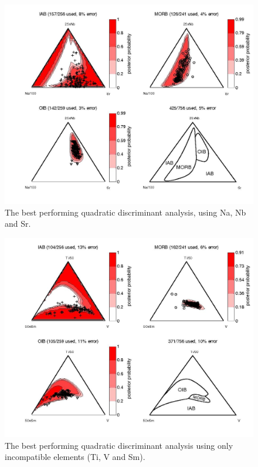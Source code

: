 \clearpage

\begin{figure}[htbp]
  \centering
  \includegraphics[width=600]{figures/Na_Nb_Sr_quad.jpg}
  \caption[Quadratic discriminant analysis using Na, Nb and Sr]
{The best performing quadratic discriminant analysis, using Na, Nb and
Sr.}
  \label{fig:Na_Nb_Sr_quad}
\end{figure}

\begin{figure}[htbp]
  \centering
  \includegraphics[width=600]{figures/V_Ti_Sm_quad.jpg}
  \caption[Quadratic discriminant analysis using Ti, V and Sm]
{The  best  performing  quadratic  discriminant  analysis  using  only
incompatible elements (Ti, V and Sm).}
  \label{fig:V_Ti_Sm_quad}
\end{figure}

